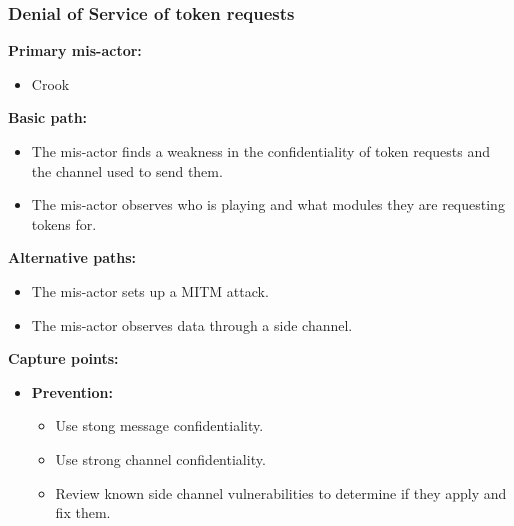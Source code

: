 \documentclass[a4paper,11pt]{report}
\begin{document}
\subsubsection{Denial of Service of token requests}
\textbf{Primary mis-actor:}
\begin{itemize}
\item Crook
\end{itemize}
\textbf{Basic path:}
\begin{itemize}
\item The mis-actor finds a weakness in the confidentiality of token requests and the channel used to send them.
\item The mis-actor observes who is playing and what modules they are requesting tokens for.
\end{itemize}
\textbf{Alternative paths:}
\begin{itemize}
\item The mis-actor sets up a MITM attack.
\item The mis-actor observes data through a side channel.
\end{itemize}
\textbf{Capture points:}
\begin{itemize}
\item \textbf{Prevention:}
\begin{itemize}
\item Use stong message confidentiality.
\item Use strong channel confidentiality.
\item Review known side channel vulnerabilities to determine if they apply and fix them.
\end{itemize}
\end{itemize}
\end{document}

